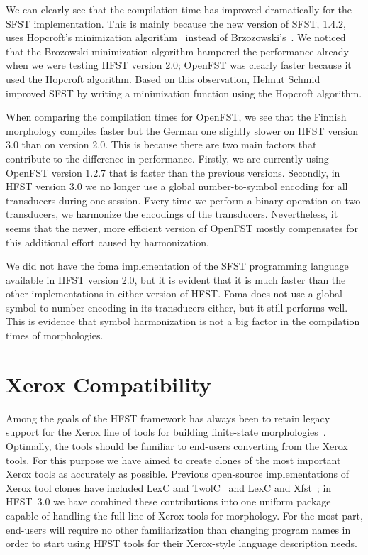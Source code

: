 \documentclass{llncs}
\begin{document}
We can clearly see that the compilation time has improved dramatically
for the SFST implementation.
This is mainly because the new version of SFST, 1.4.2, uses Hopcroft's
minimization algorithm~\cite{hopcroft/1971} instead of 
Brzozowski's~\cite{brzozowski/1964}. 
We noticed that the Brozowski minimization algorithm hampered the performance
already when we were testing HFST version 2.0; 
OpenFST was clearly faster because it used the Hopcroft algorithm. 
Based on this observation, Helmut Schmid improved SFST by 
writing a minimization function using the Hopcroft algorithm.

When comparing the compilation times for OpenFST, we see that the
Finnish morphology compiles faster but the German one slightly slower
on HFST version 3.0 than on version 2.0. This is because there are two
main factors that contribute to the difference in performance. Firstly, we
are currently using OpenFST version 1.2.7 that is faster than the
previous versions. Secondly, in HFST version 3.0 we no longer use a
global number-to-symbol encoding for all transducers during one
session. Every time we perform a binary operation on two transducers,
we harmonize the encodings of the transducers. Nevertheless, 
it seems that the newer, more efficient version of 
OpenFST mostly compensates for this additional effort caused by harmonization. 

We did not have the foma implementation of the SFST programming language 
available in HFST version 2.0, but it is evident that it is much faster than the other
implementations in either version of HFST. Foma does not use
a global symbol-to-number encoding in its transducers either, but it still
performs well. This is evidence that symbol harmonization is not a big
factor in the compilation times of morphologies. 


\section{Xerox Compatibility}\label{hfst:xerox-compatibility}
Among the goals of the HFST framework has always been to retain legacy support
for the Xerox line of tools for building finite-state
morphologies~\cite{beesley/2003}. Optimally, the tools should be familiar
to end-users converting from the Xerox tools. For this purpose we have aimed to
create clones of the most important Xerox tools as accurately as possible.
Previous open-source implementations of Xerox tool clones have included
LexC and TwolC~\cite{linden/2009/sfcm} and LexC and Xfst~\cite{hulden/2009}; in
HFST~3.0 we have combined these contributions into one uniform package capable of
handling the full line of Xerox tools for morphology. For the most part,
end-users will require no other familiarization than changing program names in
order to start using HFST tools for their Xerox-style language description
needs.
\end{document}
